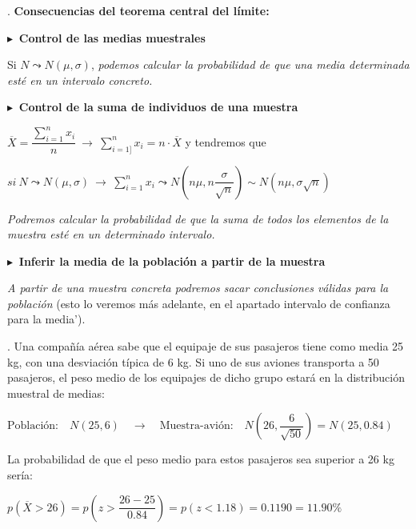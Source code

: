 \vspace{4mm}%
\begin{theorem}
. \textbf{Consecuencias del teorema central del límite:}


\vspace{4mm}  $\blacktriangleright \ $ \textbf{Control de las medias muestrales} 

\vspace{2mm} Si $N\leadsto N\left( \mu, \sigma \right)$, \emph{podemos calcular la probabilidad de que una media determinada esté en un intervalo concreto.}

\vspace{4mm} $\blacktriangleright\ $ \textbf{ Control de la suma de individuos de una muestra}

\vspace{2mm}  $\overline{X}=\displaystyle \dfrac{\sum_{i=1}^n  x_i}{n} \ \longrightarrow \ \sum_{i=1]}^n x_i=n\cdot \overline{X}$ y tendremos que

$\displaystyle si \ N\leadsto N\left( \mu, \sigma \right) \ \longrightarrow \ 
\sum_{i=1}^n x_i \leadsto N \left( n\mu, n\dfrac{\sigma}{\sqrt{n}} \right) \sim N(n\mu,\sigma \sqrt{n})$

\emph{Podremos calcular la probabilidad de que la suma de todos los elementos de la muestra esté en un determinado intervalo.}

\vspace{4mm}  $\blacktriangleright \ $ \textbf{Inferir la media de la población a partir de la muestra}

\vspace{2mm}  \emph{A partir de una muestra concreta podremos sacar conclusiones válidas para la población} (\textcolor{gris}{esto lo veremos más adelante, en el apartado intervalo de confianza para la media')}.
	
\end{theorem}

\vspace{4mm}%
\begin{example}
. 	Una compañía aérea sabe que el equipaje de sus pasajeros tiene como media 25 kg, con una desviación típica de 6 kg. Si uno de sus aviones transporta a 50 pasajeros, el peso medio de los equipajes de dicho grupo estará en la distribución muestral de medias:

\vspace{2mm} $ \text{Población:} \quad N(25,6) \quad \longrightarrow \quad \text{Muestra-avión:} \quad N \left( 26, \dfrac{6}{\sqrt{50}} \right) = N(25,0.84) $

\vspace{2mm} La probabilidad de que el peso medio para estos pasajeros sea superior a 26 kg sería:

\vspace{2mm} $ p(\overline{X}>26)=p\left( z>\dfrac{26-25}{0.84} \right) = p(z<1.18)=0.1190=11.90\%$
\end{example}

